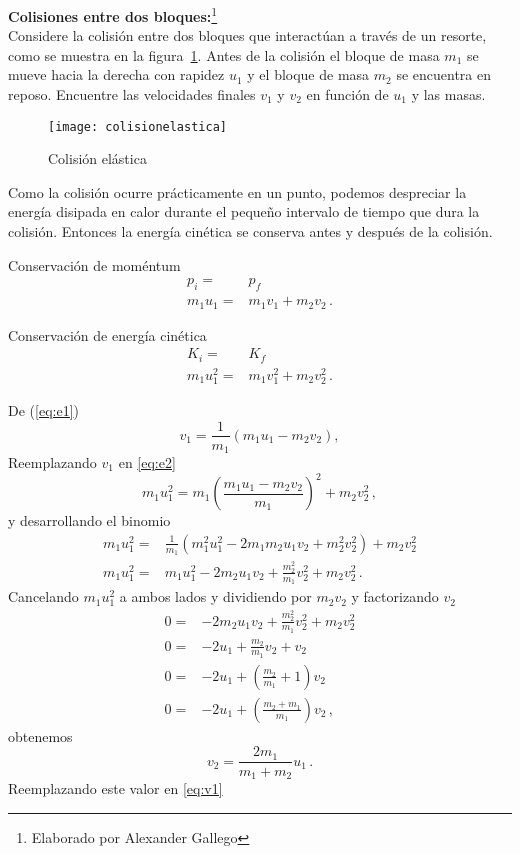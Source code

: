\ejemplo{}
\textbf{Colisiones entre dos bloques:}\footnote{Elaborado por Alexander Gallego}\\
Considere la colisión entre dos bloques que interactúan a través de un
resorte, como se muestra en la
figura~\ref{fig:colisionelastica}. 
Antes de la colisión el bloque de masa $m_1$ se mueve hacia la derecha
con rapidez $u_1$ y el bloque de masa $m_2$ se encuentra en
reposo. 
Encuentre las velocidades finales $v_1$ y $v_2$ en función de $u_1$ y
las masas.

\begin{figure}
  \centering
  \texttt{[image: colisionelastica]}
  \caption{Colisión elástica}
  \label{fig:colisionelastica}
\end{figure}

Como la colisión ocurre prácticamente en un punto, podemos despreciar
la energía disipada en calor durante el pequeño intervalo de tiempo
que dura la colisión. Entonces la energía cinética se conserva antes y
después de la colisión. 

Conservación de moméntum
\begin{align}
  \label{eq:e1}
  p_{i}=&p_f\nonumber\\
  m_1 u_1 =& m_1 v_1 + m_2 v_2\,.
\end{align}

Conservación de energía cinética
\begin{align}
  \label{eq:e2}
  K_i=&K_f\nonumber\\
  m_1 u^2_1 =& m_1 v^2_1 + m_2 v^2_2\,.
\end{align}

De (\ref{eq:e1})
\begin{equation}
  \label{eq:v1}
  v_1 = \frac{1}{m_1}( m_1u_1 - m_2 v_2),
\end{equation}
Reemplazando $v_1$ en \ref{eq:e2}
\begin{equation}
   m_1 u_1^2 = m_1 \left( \frac{m_1u_1 - m_2 v_2}{m_1} \right)^2 +  m_2 v^2_2\,,
\end{equation}
y desarrollando el binomio
\begin{align}
 m_1 u_1^2 =& \frac{1}{m_1}( m_1^2 u_1^2 - 2 m_1 m_2 u_1 v_2 + m_2^2 v_2^2) + m_2 v_2^2\nonumber\\
m_1 u_1^2 =&  m_1 u_1^2 - 2 m_2 u_1 v_2 + \frac{m_2^2}{m_1} v_2^2 + m_2 v_2^2\,.
\end{align}
Cancelando $m_1 u_1^2$ a ambos lados y dividiendo por $m_2v_2$ y factorizando $v_2$
\begin{align}
  0=& - 2 m_2 u_1 v_2 + \frac{m_2^2}{m_1} v_2^2 + m_2 v_2^2\nonumber\\
  0=& - 2  u_1  + \frac{m_2}{m_1} v_2 + v_2\nonumber\\
  0=& - 2  u_1  + \left(\frac{m_2}{m_1} +1 \right)v_2\nonumber\\
  0=& - 2  u_1  + \left(\frac{m_2+m_1}{m_1}\right)v_2\,,
\end{align}
obtenemos
\begin{equation}
  v_2 = \frac{2m_1}{m_1+ m_2}u_1\,.
\end{equation}
Reemplazando este valor en \eqref{eq:v1}

